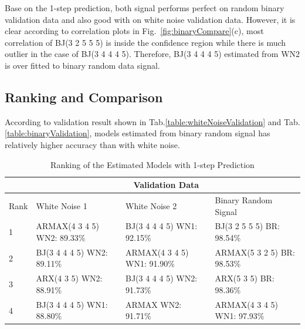 \documentclass[10pt,a4paper]{article}
\begin{document}
\par Base on the 1-step prediction, both signal performs perfect on random binary validation data and also good with on white noise validation data. However, it is clear according to correlation plots in Fig.~\ref{fig:binaryCompare}(c), most correlation of BJ(3 2 5 5 5) is inside the confidence region while there is much outlier in the case of BJ(3 4 4 4 5). Therefore, BJ(3 4 4 4 5) estimated from WN2 is over fitted to binary random data signal.
\subsection{Ranking and Comparison}
\par According to validation result shown in Tab.\ref{table:whiteNoiseValidation} and Tab.\ref{table:binaryValidation}, models estimated from binary random signal has relatively higher accuracy than with white noise.
	\begin{table}[ht]
		\footnotesize
		\centering
		\caption{Ranking of the Estimated Models with 1-step Prediction}
		\label{table:rank}
		\begin{tabular}{|l|lll|}
		\hline
		& \multicolumn{3}{c|}{Validation Data} \\
		\hline
		Rank & White Noise 1 & White Noise 2 & Binary Random Signal\\
		\hline
		1 & ARMAX(4 3 4 5) WN2: 89.33\% & BJ(3 4 4 4 5) WN1: 92.15\% & BJ(3 2 5 5 5) BR: 98.54\% \\
		2 & BJ(3 4 4 4 5) WN2: 89.11\% & ARMAX(4 3 4 5) WN1: 91.90\% & ARMAX(5 3 2 5) BR: 98.53\% \\
		3 & ARX(4 3 5) WN2: 88.91\% & BJ(3 4 4 4 5) WN2: 91.73\% & ARX(5 3 5) BR: 98.36\%\\
		4 & BJ(3 4 4 4 5) WN1: 88.80\% & ARMAX WN2: 91.71\% & ARMAX(4 3 4 5) WN1: 97.93\%\\
		\hline
		\end{tabular}
	\end{table}
\end{document}

